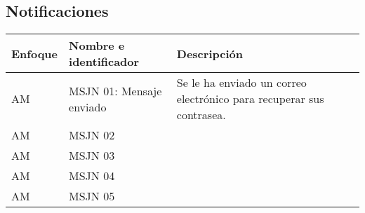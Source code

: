 \subsection{Notificaciones}
  \begin{center}
   \begin{tabular}{|p{1.5cm}|p{4cm}|p{7cm}|}
     \hline
       \textbf{Enfoque}&\textbf{Nombre e identificador} & \textbf{Descripción} \\ \hline
       \label{msjn_01} AM & MSJN 01: Mensaje enviado & Se le ha enviado un correo electrónico para recuperar sus contrasea.  \\ \hline
       \label{msjn_} AM & MSJN 02 & \\ \hline
       \label{msjn_} AM & MSJN 03 & \\ \hline
       \label{msjn_} AM & MSJN 04 & \\ \hline
       \label{msjn_} AM & MSJN 05 & \\ \hline
   \end{tabular}
    \label{tab:msjn}
 \end{center}  